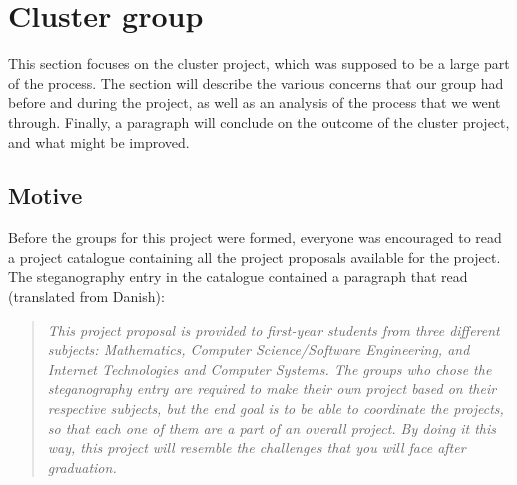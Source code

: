 \section{Cluster group}
This section focuses on the cluster project, which was supposed to be a large part of the process. The section will describe the various concerns that our group had before and during the project, as well as an analysis of the process that we went through. Finally, a paragraph will conclude on the outcome of the cluster project, and what might be improved.

\subsection*{Motive}
Before the groups for this project were formed, everyone was encouraged to read a project catalogue containing all the project proposals available for the project.
The steganography entry in the catalogue contained a paragraph that read (translated from Danish):
\begin{quote}\textit{This project proposal is provided to first-year students from three different subjects: Mathematics, Computer Science/Software Engineering, and Internet Technologies and Computer Systems.
The groups who chose the steganography entry are required to make their own project based on their respective subjects, but the end goal is to be able to coordinate the projects, so that each one of them are a part of an overall project.
By doing it this way, this project will resemble the challenges that you will face after graduation.}\end{quote}

